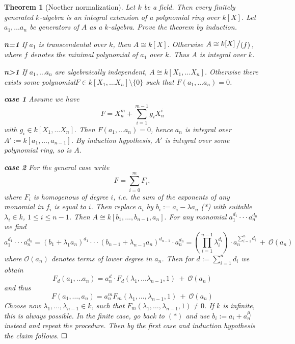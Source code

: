 \documentclass[11pt]{book}
\newtheorem{theorem}{Theorem}[section]
\theoremstyle{nonumberbreak}
\newenvironment{pr}[1][]{\ifthenelse{\equal{#1}{}}{\proof}{\proof[#1]}\rm}{\endproof}
\newcommand{\slant}[2]{{\raisebox{.1em}{$#1$}\left/\raisebox{-.1em}{$#2$}\right.}}
\begin{document}
\begin{spacing}{1.3}
\begin{theorem}[Noether normalization]
Let $k$ be a field. Then every finitely generated $k$-algebra is an integral extension of a polynomial ring over $k[X]$.
\begin{pr}
Let $a_1, \ldots a_n$ be generators of $A$ as a $k$-algebra. Prove the theorem by induction.
\begin{compactenum}
\item[\textbf{n=1}] If $a_1$ is transcendental over $k$, then $A \cong k[X]$. Otherwise $A \cong \slant{k[X]}{( f )}$, where $f$ denotes the minimal polynomial of $a_1$ over $k$. Thus $A$ is integral over $k$.
\item[\textbf{n>1}] If $a_1, \ldots a_n$ are algebraically independent, $A \cong k[X_1, \ldots X_n]$. Otherwise there exists some polynomial\newline $F \in k[X_1, \ldots X_n] \setminus \{0\}$ such that $F(a_1, \ldots a_n)=0$. 
\begin{compactenum}
\item[\textbf{case 1}] Assume we have
$$F= X_n^m+ \sum_{i=1}^{m-1} g_i X_n^i$$
with $g_i \in k[X_1, \ldots X_n]$. Then $F(a_1, \ldots a_n)=0$, hence $a_n$ is integral over $A':=k[a_1, \ldots, a_{n-1}]$. By induction hypothesis, $A'$ is integral over some polynomial ring, so is $A$.
\item[\textbf{case 2}] For the general case write
$$F=\sum_{i=0}^m  F_i,$$
where $F_i$ is homogenous of degree $i$, i.e. the sum of the exponents of any monomial in $f_i$ is equal to $i$. Then replace $a_i$ by $b_i:=a_i- \lambda a_n$ (*) with suitable $\lambda_i \in k$, $1 \leqslant i \leqslant n-1$. Then 
$A \cong k[b_1, \ldots, b_{n-1}, a_n].$
For any monomial $a_1^{d_1} \cdot \cdot \cdot a_n^{d_n}$ we find 
$$a_1^{d_1} \cdot \cdot \cdot a_n^{d_n} = \left(b_1+\lambda_1 a_n\right)^{d_1} \cdot \cdot \cdot \left(b_{n-1}+\lambda_{n-1}a_n\right)^{d_{n-1}} \cdot a_n^{d_n} = \left(\prod_{i=1}^{n-1} \lambda_i^{d_i}\right) \cdot a_n^{\sum_{i=1}^n d_i} \ + \ \mathcal{O}(a_n)$$
where $\mathcal{O}(a_n)$ denotes terms of lower degree in $a_n$. Then for $d:= \sum_{i=1}^n d_i$ we obtain
$$F_d(a_1, \ldots a_n)= a_n^d \cdot F_d(\lambda_1, \ldots \lambda_{n-1}, 1 ) \ + \ \mathcal{O}(a_n)$$
and thus
$$F(a_1, \ldots, a_n)=a_n^m F_m(\lambda_1, \ldots, \lambda_{n-1},1) \ + \ \mathcal{O}(a_n)$$
Choose now $\lambda_1, \ldots, \lambda_{n-1} \in k$, such that $F_m(\lambda_1, \ldots, \lambda_{n-1},1) \neq 0$. If $k$ is infinite, this is always possible. In the finite case, go back to $(*)$ and use $b_i:=a_i+a_n^{\mu_i}$ instead and repeat the procedure.
Then by the first case and induction hypothesis the claim follows. $\hfill \Box$
\end{compactenum}
\end{compactenum}
\end{pr}
\end{theorem}



\end{spacing}
\end{document}
